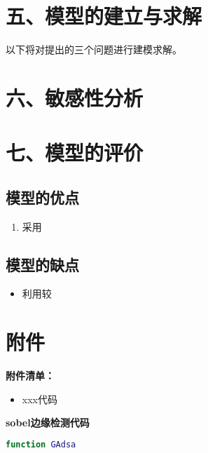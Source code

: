 \documentclass{my_paper}
\begin{document}
\section{五、模型的建立与求解}

以下将对提出的三个问题进行建模求解。
\section{六、敏感性分析}
\section{七、模型的评价}

\subsection{模型的优点}
\begin{enumerate}
    \item 采用

\end{enumerate}

\subsection{模型的缺点}
\begin{itemize}
    \item 利用较

\end{itemize}

\newpage
\begin{center}
\end{center}

\newpage
\section{附件}
\textbf{附件清单：}
\renewcommand\theenumi{\roman{enumi}}
\renewcommand\labelenumi{\textbf{附录\theenumi}}
\begin{itemize}
    \item xxx代码
\end{itemize}

\textbf{sobel边缘检测代码}

\begin{lstlisting}[language=matlab]
    function GAdsa 
\end{lstlisting}
\end{document}
